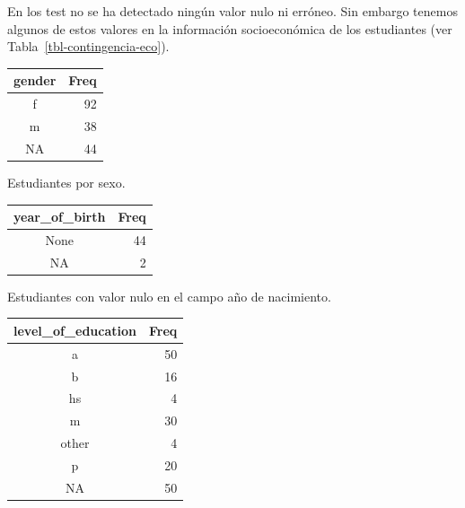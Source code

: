 \documentclass[
  12pt,
  a4paper,
  extrafontsizes,
  onecolumn,
  openright]{memoir}
\begin{document}
En los test no se ha detectado ningún valor nulo ni erróneo. Sin embargo
tenemos algunos de estos valores en la información socioeconómica de los
estudiantes (ver Tabla~\ref{tbl-contingencia-eco}).

\begin{table}

\caption{\label{tbl-contingencia-eco}Tablas de contingencia de la
información socioeconómica de los
estudiantes.}\begin{minipage}[t]{0.50\linewidth}

{\centering 

\hypertarget{tbl-contingencia-eco-1}{}
\begin{longtable}{cr}
\tabularnewline

\toprule
gender & Freq \\ 
\midrule
f & 92 \\ 
m & 38 \\ 
NA & 44 \\ 
\bottomrule
\end{longtable}

Estudiantes por sexo.

}

\end{minipage}%
%
\begin{minipage}[t]{0.50\linewidth}

{\centering 

\hypertarget{tbl-contingencia-eco-2}{}
\begin{longtable}{cr}
\tabularnewline

\toprule
year\_of\_birth & Freq \\ 
\midrule
None & 44 \\ 
NA & 2 \\ 
\bottomrule
\end{longtable}

Estudiantes con valor nulo en el campo año de nacimiento.

}

\end{minipage}%
\newline
\begin{minipage}[t]{0.50\linewidth}

{\centering 

\hypertarget{tbl-contingencia-eco-3}{}
\begin{longtable}{cr}
\tabularnewline

\toprule
level\_of\_education & Freq \\ 
\midrule
a & 50 \\ 
b & 16 \\ 
hs & 4 \\ 
m & 30 \\ 
other & 4 \\ 
p & 20 \\ 
NA & 50 \\ 
\bottomrule
\end{longtable}

}
\end{minipage}
\end{table}
\end{document}
